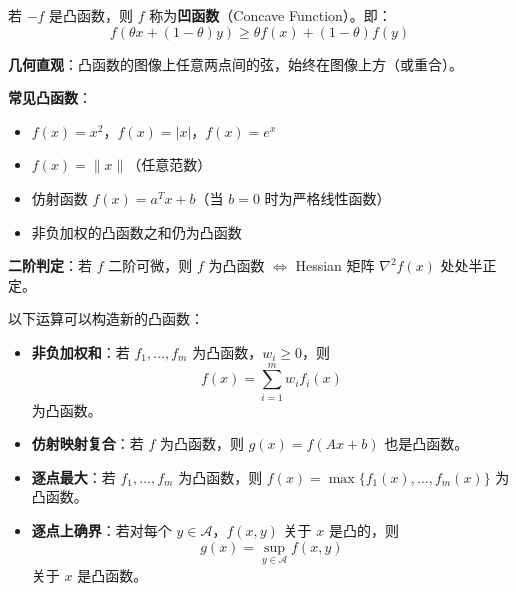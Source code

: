 \begin{definition}[凹函数]
若 $-f$ 是凸函数，则 $f$ 称为\textbf{凹函数}（Concave Function）。即：
\[
f(\theta x + (1-\theta) y) \geq \theta f(x) + (1-\theta) f(y)
\]
\end{definition}

\begin{conceptbox}[凸函数的直观理解与判定]
\textbf{几何直观}：凸函数的图像上任意两点间的弦，始终在图像上方（或重合）。

\textbf{常见凸函数}：
\begin{itemize}[itemsep=0.2em]
    \item $f(x) = x^2$，$f(x) = |x|$，$f(x) = e^x$
    \item $f(x) = \|x\|$（任意范数）
    \item 仿射函数 $f(x) = a^T x + b$（当 $b=0$ 时为严格线性函数）
    \item 非负加权的凸函数之和仍为凸函数
\end{itemize}

\textbf{二阶判定}：若 $f$ 二阶可微，则 $f$ 为凸函数 $\Leftrightarrow$ Hessian 矩阵 $\nabla^2 f(x)$ 处处半正定。
\end{conceptbox}

\begin{conceptbox}[保持凸性的运算]
以下运算可以构造新的凸函数：
\begin{itemize}[itemsep=0.3em]
    \item \textbf{非负加权和}：若 $f_1, \ldots, f_m$ 为凸函数，$w_i \geq 0$，则
    \[
    f(x) = \sum_{i=1}^{m} w_i f_i(x)
    \]
    为凸函数。
    \item \textbf{仿射映射复合}：若 $f$ 为凸函数，则 $g(x) = f(Ax + b)$ 也是凸函数。
    \item \textbf{逐点最大}：若 $f_1, \ldots, f_m$ 为凸函数，则 $f(x) = \max\{f_1(x), \ldots, f_m(x)\}$ 为凸函数。
    \item \textbf{逐点上确界}：若对每个 $y \in \mathcal{A}$，$f(x, y)$ 关于 $x$ 是凸的，则
    \[
    g(x) = \sup_{y \in \mathcal{A}} f(x, y)
    \]
    关于 $x$ 是凸函数。
\end{itemize}
\end{conceptbox}

